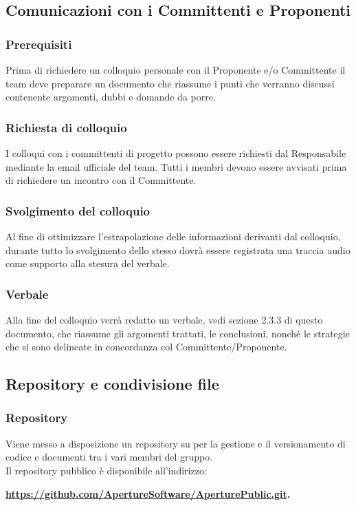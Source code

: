 \subsection{Comunicazioni con i Committenti e Proponenti}
\label{3.4}

\subsubsection{Prerequisiti}
\label{3.4.1}
Prima di richiedere un colloquio personale con il Proponente e/o Committente il team deve preparare un documento che riassume i punti che verranno discussi contenente argomenti, dubbi e domande da porre.

\subsubsection{Richiesta di colloquio}
\label{3.4.2}
I colloqui con i committenti di progetto possono essere richiesti dal Responsabile mediante la email ufficiale del team. Tutti i membri devono essere avvisati prima di richiedere un incontro con il Committente.

\subsubsection{Svolgimento del colloquio}
Al fine di ottimizzare l'estrapolazione delle informazioni derivanti dal colloquio, durante tutto lo svolgimento dello stesso dovrà essere registrata una traccia audio come supporto alla stesura del verbale.

\subsubsection{Verbale}
\label{3.4.3}
Alla fine del colloquio verrà redatto un verbale, vedi sezione 2.3.3 di questo documento, che riassume gli argomenti trattati, le conclusioni, nonché le strategie che si sono delineate in concordanza col Committente/Proponente.

\subsection{Repository e condivisione file}
\subsubsection{Repository}
Viene messo a disposizione un repository  su  per la gestione e il versionamento di codice e documenti tra i vari membri del gruppo.\\
Il repository pubblico è disponibile all'indirizzo: \\
\begin{center}
\textbf{\url{https://github.com/ApertureSoftware/AperturePublic.git}.}
\end{center}

